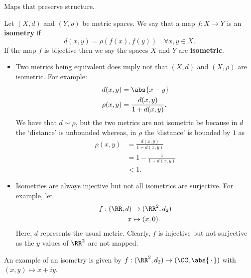 \documentclass[12pt, a4paper]{article}
\begin{document}
\begin{mdremark}
    Maps that preserve structure.
\end{mdremark}

\begin{definition}
    Let \((X,d)\) and \((Y,\rho)\) be metric spaces. We say that a map \(f:X \to Y\) is an \textbf{isometry} if 
    \[d(x,y) =\rho(f(x),f(y)) \quad \forall x,y \in X.\]
    If the map \(f\) is bijective then we say the spaces \(X\) and \(Y\) are \textbf{isometric}.
\end{definition}

\begin{mdremark}
    \hphantom{wham}
    \begin{itemize}
        \item Two metrics being equivalent does imply not that \((X,d)\) and \((X,\rho)\) are isometric. For example:
        \[\begin{aligned}
            d(x,y) &= \abs{x-y} \\
            \rho(x,y) &= \frac{d(x,y)}{1+d(x,y)}. 
        \end{aligned}\]
        We have that \(d \sim \rho\), but the two metrics are not isometric be because in \(d\) the `distance' is unbounded whereas, in \(\rho\) the `distance' is bounded by \(1\) as 
        \[\begin{aligned}
            \rho(x,y) &=\frac{d(x,y)}{1+d(x,y)} \\
            &= 1 - \frac{1}{1+d(x,y)} \\
            &< 1.
        \end{aligned}\]
        \item Isometries are always injective but not all isometrics are surjective. For example, let 
        \[\begin{aligned}
            f:(\RR,d) &\to (\RR^2,d_2) \\
            x &\mapsto (x,0).
        \end{aligned}\]
        Here, \(d\) represents the usual metric. Clearly, \(f\) is injective but not surjective as the \(y\) values of \(\RR^2\) are not mapped.
    \end{itemize}
\end{mdremark}

\begin{example}
    An example of an isometry is given by \(f : (\RR^2, d_2) \to (\CC, \abs{\, \cdot \,})\) with \((x,y) \mapsto x+iy\).
\end{example}
\end{document}
